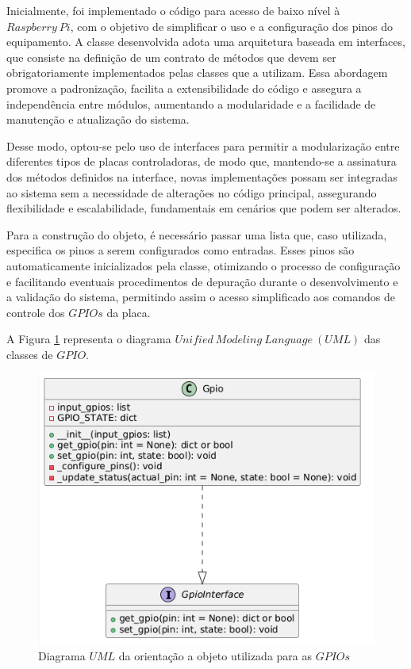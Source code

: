 \documentclass{ecatfg}
\begin{document}
Inicialmente, foi implementado o código para acesso de baixo nível à $Raspberry\ Pi$, com o objetivo de simplificar o uso e a configuração dos pinos do equipamento. A classe desenvolvida adota uma arquitetura baseada em interfaces, que consiste na definição de um contrato de métodos que devem ser obrigatoriamente implementados pelas classes que a utilizam. Essa abordagem promove a padronização, facilita a extensibilidade do código e assegura a independência entre módulos, aumentando a modularidade e a facilidade de manutenção e atualização do sistema.\par

Desse modo, optou-se pelo uso de interfaces para permitir a modularização entre diferentes tipos de placas controladoras, de modo que, mantendo-se a assinatura dos métodos definidos na interface, novas implementações possam ser integradas ao sistema sem a necessidade de alterações no código principal, assegurando flexibilidade e escalabilidade, fundamentais em cenários que podem ser alterados.\par

Para a construção do objeto, é necessário passar uma lista que, caso utilizada, especifica os pinos a serem configurados como entradas. Esses pinos são automaticamente inicializados pela classe, otimizando o processo de configuração e facilitando eventuais procedimentos de depuração durante o desenvolvimento e a validação do sistema, permitindo assim o acesso simplificado aos comandos de controle dos $GPIOs$ da placa.\par

A Figura \ref{fig:3} representa o diagrama $Unified\ Modeling\ Language\ (UML)$ \cite{uml} das classes de $GPIO$.\par

\begin{figure}[!htb]
    \centering
    \includegraphics[scale=0.35]{Figuras/diagrama_uml_gpio.png}
    \caption{Diagrama $UML$ da orientação a objeto utilizada para as $GPIOs$}
    \label{fig:3}
\end{figure}
\end{document}
